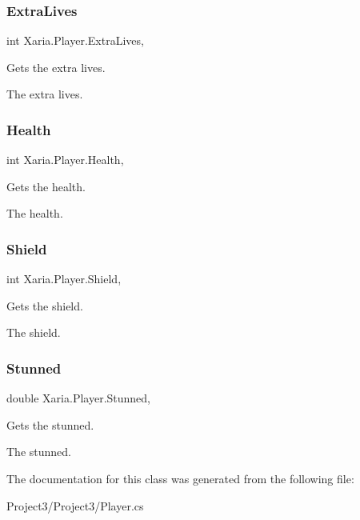 \subsubsection{\texorpdfstring{Extra\+Lives}{ExtraLives}}
{\footnotesize\ttfamily int Xaria.\+Player.\+Extra\+Lives\hspace{0.3cm}{\ttfamily [get]}, {}}



Gets the extra lives. 

The extra lives. \mbox{\label{classXaria_1_1Player_a48a4972a17acb525adca1a30454eaf30}} 
\subsubsection{\texorpdfstring{Health}{Health}}
{\footnotesize\ttfamily int Xaria.\+Player.\+Health\hspace{0.3cm}{\ttfamily [get]}, {}}



Gets the health. 

The health. \mbox{\label{classXaria_1_1Player_a9f03b368b1fa510b106921d0033365e5}} 
\subsubsection{\texorpdfstring{Shield}{Shield}}
{\footnotesize\ttfamily int Xaria.\+Player.\+Shield\hspace{0.3cm}{\ttfamily [get]}, {}}



Gets the shield. 

The shield. \mbox{\label{classXaria_1_1Player_ae675000d7990d74024d26bfa9691d722}} 
\subsubsection{\texorpdfstring{Stunned}{Stunned}}
{\footnotesize\ttfamily double Xaria.\+Player.\+Stunned\hspace{0.3cm}{\ttfamily [get]}, {}}



Gets the stunned. 

The stunned. 

The documentation for this class was generated from the following file\+:\begin{DoxyCompactItemize}
\item 
Project3/\+Project3/Player.\+cs\end{DoxyCompactItemize}
